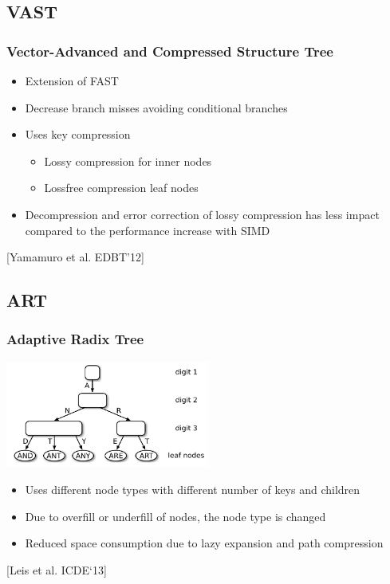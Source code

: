 \documentclass{beamer}
\begin{document}
\subsection{VAST}
\begin{frame}
	\frametitle{Vector-Advanced and Compressed Structure Tree}
	\begin{itemize}
		\item Extension of FAST
		\item Decrease branch misses avoiding conditional branches
		\item Uses key compression
		\begin{itemize}
			\item Lossy compression for inner nodes
			\item Lossfree compression leaf nodes
		\end{itemize}
		\item  Decompression and error correction of lossy compression has less impact compared to the performance increase with SIMD
	\end{itemize}
	\vspace*{\fill}
	\begin{center}
		\tiny [Yamamuro et al. EDBT’12]
	\end{center}
\end{frame}

\subsection{ART}
\begin{frame}
	\frametitle{Adaptive Radix Tree}
	\begin{center}
		\includegraphics[width=0.5\textwidth]{img/art2.pdf}
	\end{center}
	\begin{itemize}
		\item Uses different node types with different number of keys and children
		\item Due to overfill or underfill of nodes, the node type is changed
		\item Reduced space consumption due to lazy expansion and path compression
	\end{itemize}
	\begin{center}
		 \tiny [Leis et al.  ICDE`13]
	\end{center}

\end{frame}
\end{document}
